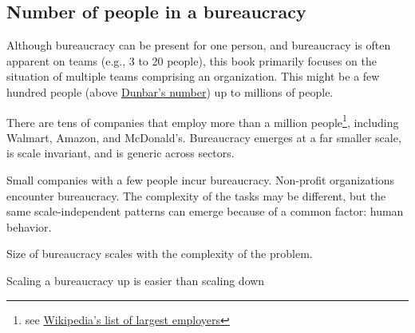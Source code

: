 \subsection{Number of people in a bureaucracy}
Although bureaucracy can be present for one person, and bureaucracy is often apparent on teams (e.g., 3 to 20 people), this book primarily focuses on the situation of multiple teams comprising an organization. This might be a few hundred people (above \href{https://en.wikipedia.org/wiki/Dunbar's_number}{Dunbar's number}) up to millions of people. 

There are tens of companies that employ more than a million people\footnote{see \href{https://en.wikipedia.org/wiki/List_of_largest_employers}{Wikipedia's list of largest employers}}, including Walmart, Amazon, and McDonald's. Bureaucracy emerges at a far smaller scale, is scale invariant, and is generic across sectors. 

Small companies with a few people incur bureaucracy. Non-profit organizations encounter bureaucracy. The complexity of the tasks may be different, but the same scale-independent patterns can emerge because of a common factor: human behavior.

Size of bureaucracy scales with the complexity of the problem. 

Scaling a bureaucracy up is easier than scaling down